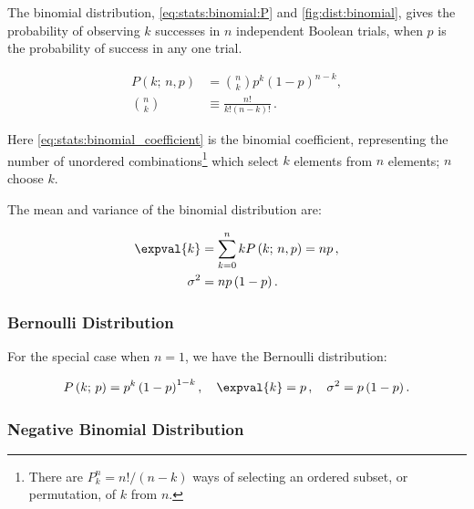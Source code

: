 The binomial distribution, \cref{eq:stats:binomial:P} and \cref{fig:dist:binomial},
gives the probability of observing $k$ successes in $n$ independent Boolean trials,
when $p$ is the probability of success in any one trial.

\begin{subequations}\label{eq:stats:binomial}
\begin{align}
P\left(k;\,n,p\right) &= {n \choose k}p^{k} \left(1-p\right)^{n-k}, \label{eq:stats:binomial:P} \\
{n \choose k} &\equiv \frac{n!}{k!\left(n-k\right)!}\,. \label{eq:stats:binomial_coefficient}
\end{align}
\end{subequations}

\noindent Here \cref{eq:stats:binomial_coefficient} is the binomial coefficient,
representing the number of unordered combinations\footnote{There are
$P_{k}^{n} = n! / \left(n-k\right)$ ways of selecting an ordered subset,
or permutation, of $k$ from $n$.} which select $k$ elements from $n$ elements; $n$ choose $k$.

The mean and variance of the binomial distribution are:

\begin{subequations}\label{eq:stats:binomial:mean_variance}
\begin{align}
\expval{k} &= \sum_{k=0}^{n} k P\left(k;\,n,p\right) = n p\,, \label{eq:stats:binomial:mean} \\
\sigma^{2} &= n p\left(1-p\right). \label{eq:stats:binomial:variance}
\end{align}
\end{subequations}

\subsubsection{Bernoulli Distribution}
\label{stats:binomial:bernoulli}

For the special case when $n=1$, we have the Bernoulli distribution:

\begin{equation}\label{eq:stats:bernoulli}
P\left(k;\,p\right) = p^{k} \left(1-p\right)^{1-k}, \quad \expval{k} = p\,, \quad \sigma^{2} = p\left(1-p\right).
\end{equation}

\subsubsection{Negative Binomial Distribution}
\label{stats:binomial:negative}

